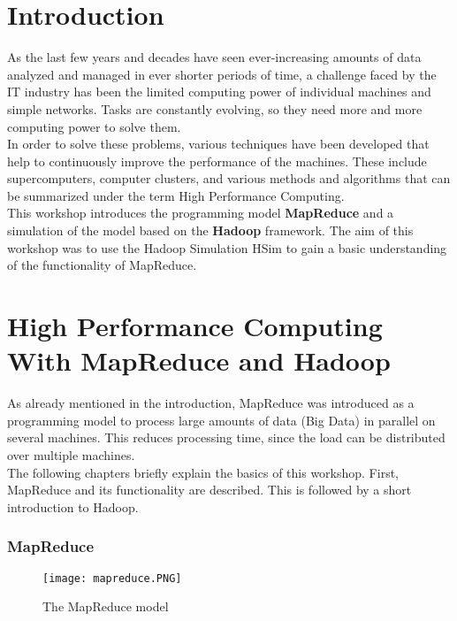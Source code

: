 \lstset{language=Java, numbers=left, numberstyle=\tiny, stepnumber=2, numbersep=5pt}
\chapter{Introduction}
\label{intro}
As the last few years and decades have seen ever-increasing amounts of data analyzed and managed in ever shorter periods of time, a challenge faced by the IT industry has been the limited computing power of individual machines and simple networks. Tasks are constantly evolving, so they need more and more computing power to solve them.\\
In order to solve these problems, various techniques have been developed that help to continuously improve the performance of the machines. These include supercomputers, computer clusters, and various methods and algorithms that can be summarized under the term High Performance Computing.\\
This workshop introduces the programming model \textbf{MapReduce} and a simulation of the model based on the \textbf{Hadoop} framework. The aim of this workshop was to use the Hadoop Simulation HSim to gain a basic understanding of the functionality of MapReduce.
\chapter{High Performance Computing With MapReduce and Hadoop}
\label{mapreduce}
As already mentioned in the introduction, MapReduce was introduced as a programming model to process large amounts of data (Big Data) in parallel on several machines. This reduces processing time, since the load can be distributed over multiple machines.\\
The following chapters briefly explain the basics of this workshop. First, MapReduce and its functionality are described. This is followed by a short introduction to Hadoop.
\subsection{MapReduce}
\begin{figure}[H]
	\centering
	\texttt{[image: mapreduce.PNG]}
	\caption[Caption for LOF]{The MapReduce model\footnotemark}
	\label{mapreducepic}
\end{figure}

